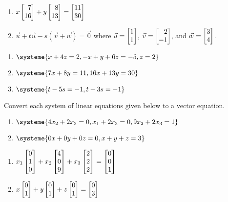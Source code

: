 \begin{exercises}
\begin{problist}
\begin{enumerate}
			\item $x\mat{7 \\ 16}+y\mat{8 \\ 13}=\mat{11 \\ 30}$

			\item $\vec u+t\vec u - s(\vec v+\vec w)=\vec 0$ where $\vec u=\mat{1\\1}$,
				$\vec v=\mat{2\\-1}$, and $\vec w=\mat{3\\4}$.
		\end{enumerate}
		\begin{solution}
			\begin{enumerate}
				\item $\systeme{x+4z=2, -x+y+6z=-5, z=2}$

				\item $\systeme{7x+8y=11, 16x+13y=30}$

				\item $\systeme{t-5s=-1, t-3s=-1}$
			\end{enumerate}
		\end{solution}

		\prob Convert each system of linear equations given below to a vector equation.
		\begin{enumerate}
			\item $\systeme{4x_2+2x_3=0, x_1+2x_3=0, 9x_2+2x_3=1}$

			\item $\systeme{0x+0y+0z=0, x+y+z=3}$
		\end{enumerate}

		\begin{solution}
			\begin{enumerate}
				\item $x_{1}\mat{0 \\ 1 \\ 0}+x_{2}\mat{4 \\ 0 \\ 9}+x_{3}\mat{2 \\ 2 \\ 2}
					=\mat{0 \\ 0 \\ 1}$

				\item $x\mat{0 \\ 1}+y\mat{0 \\ 1}+z\mat{0 \\ 1}=\mat
					{0 \\ 3}$
			\end{enumerate}
		\end{solution}


\end{problist}
\end{exercises}
